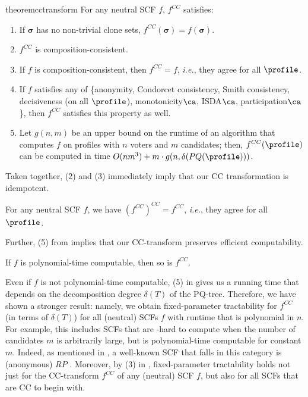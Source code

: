 \begin{restatable}{theorem}{cctransform} \label{thm:cc_transform}
    For any neutral SCF $f$, $f^{CC}$ satisfies:
    \begin{enumerate}[label={(\arabic*)}]
        \item If $\boldsymbol{\sigma}$ has no non-trivial clone sets, $f^{CC}(\boldsymbol{\sigma})=f(\boldsymbol{\sigma})$.
        \item $f^{CC}$ is composition-consistent.
        \item If $f$ is composition-consistent, then $f^{CC}=f$, \emph{i.e.}, they agree for all $\profile$.
        \item If $f$ satisfies any of \{anonymity, Condorcet consistency, Smith consistency, decisiveness (on all $\profile$), monotonicity$\ca$, ISDA$\ca$, participation$\ca$\}, then $f^{CC}$ satisfies this property as well.
        \item Let $g(n, m)$ be an upper bound on the runtime of an algorithm that computes $f$ on profiles with $n$ voters and $m$ candidates; then, $f^{CC}(\profile)$ can be computed in time $O(nm^3) + m \cdot g(n, \delta(PQ(\profile)))$.
    \end{enumerate}
\end{restatable}

\noindent Taken together, (2) and (3) immediately imply that our CC transformation is idempotent.
\begin{corollary}
    For any neutral SCF $f$, we have $(f^{CC})^{CC}=f^{CC}$, \emph{i.e.}, they agree for all $\profile$.
\end{corollary}

\noindent Further, (5) from  implies that our CC-transform preserves efficient computability. 
\begin{corollary}
    If $f$ is polynomial-time computable, then so is $f^{CC}$.
\end{corollary}

Even if $f$ is not polynomial-time computable, (5) in  gives us a running time that depends on the decomposition degree $\delta(T)$ of the PQ-tree. Therefore, we have shown a stronger result: namely, we obtain fixed-parameter tractability for $f^{CC}$ (in terms of $\delta(T)$) for all (neutral) SCFs $f$ with runtime that is polynomial in $n$. 
For example, this includes SCFs that are \NP-hard to compute when the number of candidates $m$ is arbitrarily large, but is polynomial-time computable for constant $m$. Indeed, as mentioned in , a well-known SCF that falls in this category is (anonymous) $RP$ \citep{Brill12:Price}.
Moreover, by (3) in , fixed-parameter tractability holds not just for the CC-transform $f^{CC}$ of any (neutral) SCF $f$, but also for all SCFs that are CC to begin with. 

